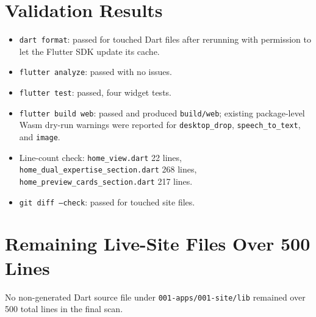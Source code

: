 \documentclass[11pt]{article}
\begin{document}
\section{Validation Results}
\begin{itemize}[leftmargin=*]
  \item \texttt{dart format}: passed for touched Dart files after rerunning with permission to let the Flutter SDK update its cache.
  \item \texttt{flutter analyze}: passed with no issues.
  \item \texttt{flutter test}: passed, four widget tests.
  \item \texttt{flutter build web}: passed and produced \texttt{build/web}; existing package-level Wasm dry-run warnings were reported for \texttt{desktop\_drop}, \texttt{speech\_to\_text}, and \texttt{image}.
  \item Line-count check: \texttt{home\_view.dart} 22 lines, \texttt{home\_dual\_expertise\_section.dart} 268 lines, \texttt{home\_preview\_cards\_section.dart} 217 lines.
  \item \texttt{git diff --check}: passed for touched site files.
\end{itemize}

\section{Remaining Live-Site Files Over 500 Lines}
No non-generated Dart source file under \texttt{001-apps/001-site/lib} remained over 500 total lines in the final scan.
\end{document}
